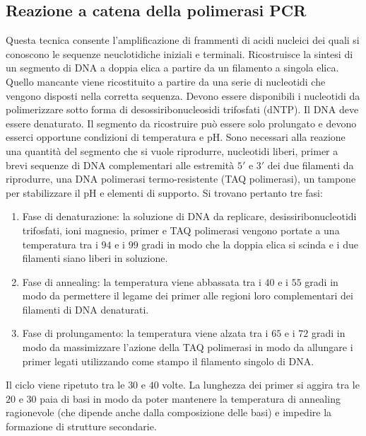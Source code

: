 \subsection{Reazione a catena della polimerasi PCR}
Questa tecnica consente l'amplificazione di frammenti di acidi nucleici dei quali si conoscono le sequenze neuclotidiche iniziali e terminali. Ricostruisce la sintesi di un segmento di 
DNA a doppia elica a partire da un filamento a singola elica. Quello mancante viene ricostituito a partire da una serie di nucleotidi che vengono disposti nella corretta sequenza. 
Devono essere disponibili i nucleotidi da polimerizzare sotto forma di desossiribonucleosidi trifosfati (dNTP). Il DNA deve essere denaturato. Il segmento da ricostruire pu\`o essere 
solo prolungato e devono esserci opportune condizioni di temperatura e pH. Sono necessari alla reazione una quantit\`a del segmento che si vuole riprodurre, nucleotidi liberi, primer 
a brevi sequenze di DNA complementari alle estremit\`a $5'$ e $3'$ dei due filamenti da riprodurre, una DNA polimerasi termo-resistente (TAQ polimerasi), un tampone per stabilizzare il 
pH e elementi di supporto. Si trovano pertanto tre fasi: 
\begin{enumerate}
	\item Fase di denaturazione: la soluzione di DNA da replicare, desissiribonucleotidi trifosfati, ioni magnesio, primer e TAQ polimerasi vengono portate a una temperatura tra i 
		$94$ e i $99$ gradi in modo che la doppia elica si scinda e i due filamenti siano liberi in soluzione.
	\item Fase di annealing: la temperatura viene abbassata tra i $40$ e i $55$ gradi in modo da permettere il legame dei primer alle regioni loro complementari dei filamenti di DNA 
		denaturati.
	\item Fase di prolungamento: la temperatura viene alzata tra i $65$ e i $72$ gradi in modo da massimizzare l'azione della TAQ polimerasi in modo da allungare i primer legati 
		utilizzando come stampo il filamento singolo di DNA.
\end{enumerate}
Il ciclo viene ripetuto tra le $30$ e $40$ volte. La lunghezza dei primer si aggira tra le $20$ e $30$ paia di basi in modo da poter mantenere la temperatura di annealing ragionevole
(che dipende anche dalla composizione delle basi) e  impedire la formazione di strutture secondarie.
